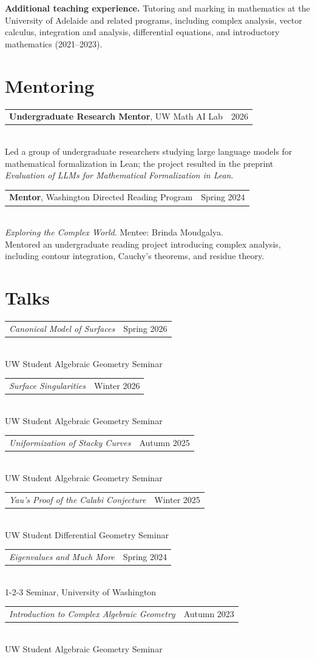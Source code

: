 \documentclass[11pt]{article}
\makeatletter
\newcommand{\cvitem}[2]{%
  \noindent
  \begin{tabularx}{\textwidth}{@{}Xr@{}}
    #1 & #2
  \end{tabularx}
}
\newcommand{\talk}[3]{%
  \cvitem{\textit{#1}}{#3}\\[-1pt]
  #2
  \vspace{5pt}
}
\makeatother
\begin{document}
\vspace{7pt}
\textbf{Additional teaching experience.}
Tutoring and marking in mathematics at the University of Adelaide and related programs,
including complex analysis, vector calculus, integration and analysis, differential equations,
and introductory mathematics (2021--2023).

\section{Mentoring}

\cvitem{\textbf{Undergraduate Research Mentor}, UW Math AI Lab}{2026}\\[-1pt]
Led a group of undergraduate researchers studying large language models for mathematical
formalization in Lean; the project resulted in the preprint
\textit{Evaluation of LLMs for Mathematical Formalization in Lean}.
\vspace{7pt}

\cvitem{\textbf{Mentor}, Washington Directed Reading Program}{Spring 2024}\\[-1pt]
\textit{Exploring the Complex World}. Mentee: Brinda Moudgalya.\\
Mentored an undergraduate reading project introducing complex analysis, including contour
integration, Cauchy's theorems, and residue theory.

\section{Talks}

\talk
  {Canonical Model of Surfaces}
  {UW Student Algebraic Geometry Seminar}
  {Spring 2026}

\talk
  {Surface Singularities}
  {UW Student Algebraic Geometry Seminar}
  {Winter 2026}

\talk
  {Uniformization of Stacky Curves}
  {UW Student Algebraic Geometry Seminar}
  {Autumn 2025}

\talk
  {Yau's Proof of the Calabi Conjecture}
  {UW Student Differential Geometry Seminar}
  {Winter 2025}

\talk
  {Eigenvalues and Much More}
  {1-2-3 Seminar, University of Washington}
  {Spring 2024}

\talk
  {Introduction to Complex Algebraic Geometry}
  {UW Student Algebraic Geometry Seminar}
  {Autumn 2023}
\end{document}
